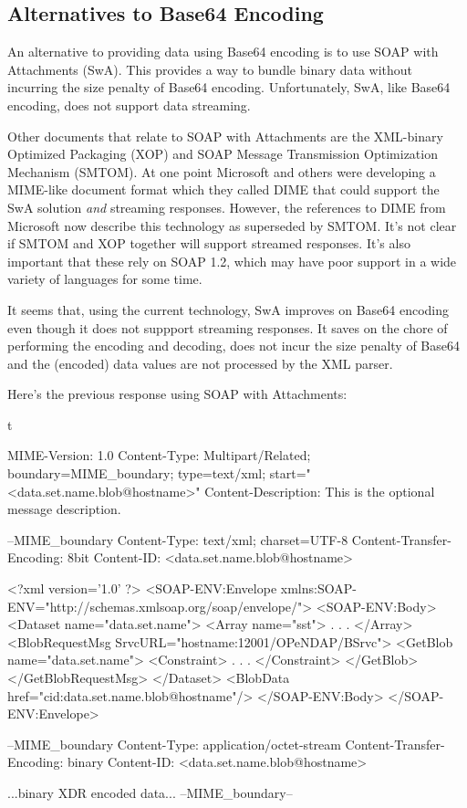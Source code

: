\documentclass[justify]{dods-paper}
\begin{document}
\subsection{Alternatives to Base64 Encoding}

An alternative to providing data using Base64 encoding is to use SOAP
with Attachments (SwA).\cite{w3c:SwA} This provides a way to bundle
binary data without incurring the size penalty of Base64 encoding.
Unfortunately, SwA, like Base64 encoding, does not support data
streaming.

Other documents that relate to SOAP with Attachments are the
XML-binary Optimized Packaging\cite{w3c:XOP} (XOP) and SOAP Message
Transmission Optimization Mechanism\cite{w3c:SMTOM} (SMTOM). At one
point Microsoft and others were developing a MIME-like document format
which they called DIME that could support the SwA solution \emph{and}
streaming responses. However, the references to DIME from Microsoft
now describe this technology as superseded by SMTOM. It's not clear if
SMTOM and XOP together will support streamed responses. It's also
important that these rely on SOAP 1.2, which may have poor support in
a wide variety of languages for some time.

It seems that, using the current technology, SwA improves on Base64
encoding even though it does not suppport streaming responses. It
saves on the chore of performing the encoding and decoding, does not
incur the size penalty of Base64 and the (encoded) data values are not
processed by the XML parser.

Here's the previous response using SOAP with Attachments:

\begin{vcode}{t}

MIME-Version: 1.0
Content-Type: Multipart/Related; boundary=MIME_boundary; type=text/xml;
        start="<data.set.name.blob@hostname>"
Content-Description: This is the optional message description.

--MIME_boundary
Content-Type: text/xml; charset=UTF-8
Content-Transfer-Encoding: 8bit
Content-ID: <data.set.name.blob@hostname>

<?xml version='1.0' ?>
<SOAP-ENV:Envelope xmlns:SOAP-ENV="http://schemas.xmlsoap.org/soap/envelope/">
<SOAP-ENV:Body>
    <Dataset name="data.set.name">
        <Array name="sst">
            .
            .
            .
        </Array>
        <BlobRequestMsg SrvcURL="hostname:12001/OPeNDAP/BSrvc">
            <GetBlob name="data.set.name">
                <Constraint>
                   .
                   .
                   .
                </Constraint>
            </GetBlob>
        </GetBlobRequestMsg>
    </Dataset>
    <BlobData href="cid:data.set.name.blob@hostname"/>
</SOAP-ENV:Body>
</SOAP-ENV:Envelope>

--MIME_boundary
Content-Type: application/octet-stream
Content-Transfer-Encoding: binary
Content-ID: <data.set.name.blob@hostname>

...binary XDR encoded data...
--MIME_boundary--

    
\end{vcode}
\end{document}

